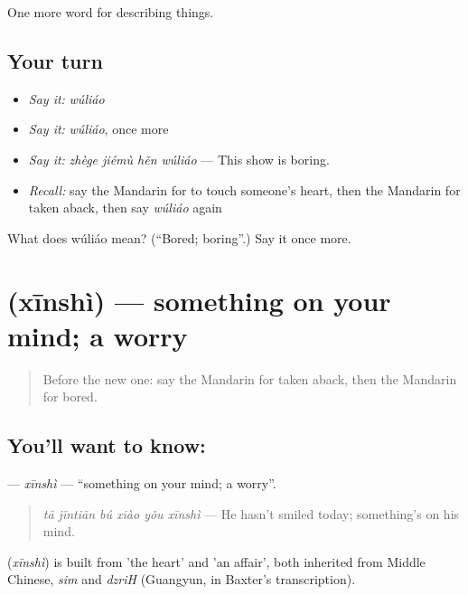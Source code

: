 \begin{grammarlens}[title={What you've built}]
One more word for describing things.
\end{grammarlens}

\subsection*{Your turn}
\begin{itemize}
\raggedright
  \item \emph{Say it:} \emph{wúliáo}
  \item \emph{Say it:} \emph{wúliáo}, once more
  \item \emph{Say it:} \emph{zhège jiémù hěn wúliáo} — This show is boring.
  \item \emph{Recall:} say the Mandarin for to touch someone's heart, then the Mandarin for taken aback, then say \emph{wúliáo} again
\end{itemize}

\begin{tcolorbox}[breakable,colback=teal!4,colframe=teal!35!black,title={Before you move on}]
What does wúliáo mean? (\textquotedblleft{}Bored; boring\textquotedblright{}.) Say it once more.
\end{tcolorbox}
\section[\texorpdfstring{\zh{心事} (xīnshì)}{心事 (xīnshì)}]{ (xīnshì) — something on your mind; a worry}

\label{lesson:ZH-C271-xinshi}



\begin{quote}
Before the new one: say the Mandarin for taken aback, then the Mandarin for bored.
\end{quote}

\subsection*{You'll want to know: }
\textbf{} — \emph{xīnshì} — \textquotedblleft{}something on your mind; a worry\textquotedblright{}.

\begin{quote}
\textbf{} \emph{tā jīntiān bú xiào yǒu xīnshì} — He hasn't smiled today; something's on his mind.
\end{quote}

\begin{cousinweb}
\textbf{} (\emph{xīnshì}) is built from  'the heart' and  'an affair', both inherited from Middle Chinese, \emph{sim} and \emph{dzriH} (Guangyun, in Baxter's transcription).
\end{cousinweb}

